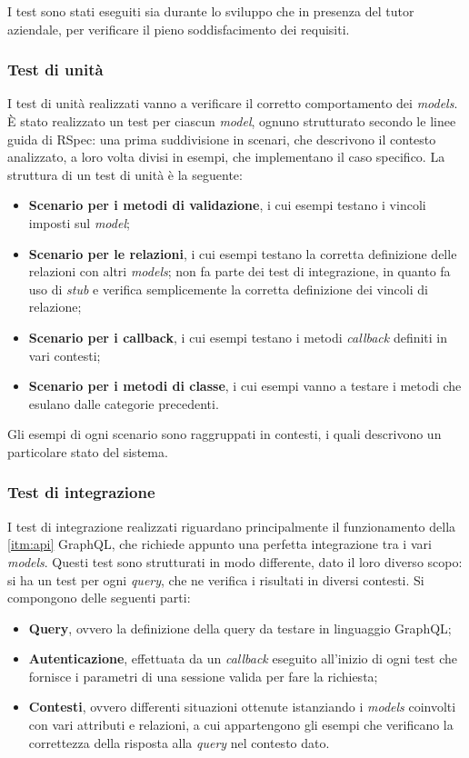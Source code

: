 I test sono stati eseguiti sia durante lo sviluppo che in presenza del tutor aziendale, per verificare il pieno soddisfacimento dei requisiti.
\subsubsection{Test di unità}
I test di unità realizzati vanno a verificare il corretto comportamento dei \textit{models}. È stato realizzato un test per ciascun \textit{model}, ognuno strutturato secondo le linee guida di RSpec: una prima suddivisione in scenari, che descrivono il contesto analizzato, a loro volta divisi in esempi, che implementano il caso specifico. La struttura di un test di unità è la seguente:
\begin{itemize}
    \item \textbf{Scenario per i metodi di validazione}, i cui esempi testano i vincoli imposti sul \textit{model};
    \item \textbf{Scenario per le relazioni}, i cui esempi testano la corretta definizione delle relazioni con altri \textit{models}; non fa parte dei test di integrazione, in quanto fa uso di \textit{stub} e verifica semplicemente la corretta definizione dei vincoli di relazione;
    \item \textbf{Scenario per i callback}, i cui esempi testano i metodi \textit{callback} definiti in vari contesti;
    \item \textbf{Scenario per i metodi di classe}, i cui esempi vanno a testare i metodi che esulano dalle categorie precedenti.
\end{itemize}

Gli esempi di ogni scenario sono raggruppati in contesti, i quali descrivono un particolare stato del sistema.
\subsubsection{Test di integrazione}
I test di integrazione realizzati riguardano principalmente il funzionamento della \ref{itm:api} GraphQL, che richiede appunto una perfetta integrazione tra i vari \textit{models}. Questi test sono strutturati in modo differente, dato il loro diverso scopo: si ha un test per ogni \textit{query}, che ne verifica i risultati in diversi contesti. Si compongono delle seguenti parti:
\begin{itemize}
    \item \textbf{Query}, ovvero la definizione della query da testare in linguaggio GraphQL;
    \item \textbf{Autenticazione}, effettuata da un \textit{callback} eseguito all'inizio di ogni test che fornisce i parametri di una sessione valida per fare la richiesta;
    \item \textbf{Contesti}, ovvero differenti situazioni ottenute istanziando i \textit{models} coinvolti con vari attributi e relazioni, a cui appartengono gli esempi che verificano la correttezza della risposta alla \textit{query} nel contesto dato.
\end{itemize}

